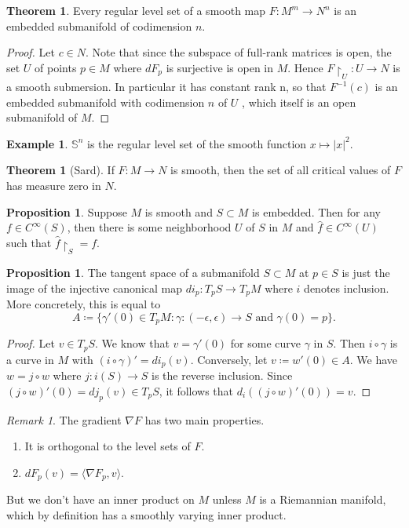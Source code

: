 \documentclass[10pt,letterpaper,cm]{nupset}
\theoremstyle{definition}
\newtheorem{exmp}[definition]{Example}
\theoremstyle{theorem}
\newtheorem{theorem}[definition]{Theorem}
\newtheorem{prop}[definition]{Proposition}
\theoremstyle{remark}
\newtheorem{remark}[definition]{Remark}
\renewcommand{\S}{\mathbb S}
\newcommand{\1}{\mathbf{1}}
\newcommand{\0}{\vec 0}
\begin{document}
\begin{theorem}
Every regular level set of a smooth map $F: M^m \to N^n$ is an embedded submanifold of codimension $n$.
\end{theorem}
\begin{proof}
Let $c \in N$. Note that since the subspace of full-rank matrices is open, the set $U$ of points $p\in M$ where $dF_p$ is surjective is open in $M$. Hence $F\restriction_U : U \to N$ is a smooth submersion. In particular it has constant rank n, so that $F^{-1}(c)$ is an embedded submanifold with codimension $n$ of $U$ , which itself is an open submanifold of $M$.
\end{proof}

\begin{exmp}
$\S^n$ is the regular level set of the smooth function $x\mapsto |x|^2$.
\end{exmp}

\begin{theorem}[Sard]
If $F: M \to N$ is smooth, then the set of all critical values of $F$ has measure zero in $N$.
\end{theorem}

\begin{prop}
Suppose $M$ is smooth and $S\subset M$ is embedded. Then for any $f \in C^{\infty}(S)$, then there is some neighborhood $U$ of $S$ in $M$ and $\hat{f} \in C^{\infty}(U)$ such that $\hat{f}\restriction_S = f$.
\end{prop}
\begin{prop}
The tangent space of a submanifold $S \subset M$ at $p\in S$ is just the image of the injective canonical map $di_p : T_pS \to T_p M$ where $i$ denotes inclusion. More concretely, this is equal to $$A\coloneqq \{ \gamma ' (0) \in T_pM : \gamma : (-\epsilon, \epsilon) \to S \text{ and } \gamma(0) =p\}.$$
\end{prop}
\begin{proof}
Let $v \in T_pS$. We know that $v= \gamma'(0)$ for some curve $\gamma$ in $S$. Then $i \circ \gamma$ is a curve in $M$ with $(i \circ \gamma)'= di_p(v)$. Conversely, let $v\coloneqq  w'(0) \in A$. We have $w = j \circ w$ where $j: i(S) \to S$ is the reverse inclusion. Since $(j \circ w)'(0) = dj_p(v) \in T_pS$, it follows that $d_i((j \circ w)'(0)) = v$.
\end{proof}


\begin{remark}
The gradient $\nabla F$ has two main properties.
\begin{enumerate}
\item It is orthogonal to the level sets of $F$.
\item $dF_p(v) = \langle \nabla F_p, v\rangle$.
\end{enumerate}
But we don't have an inner product on $M$ unless $M$ is a Riemannian manifold, which by definition has a smoothly varying inner product. 
\end{remark}
\end{document}
